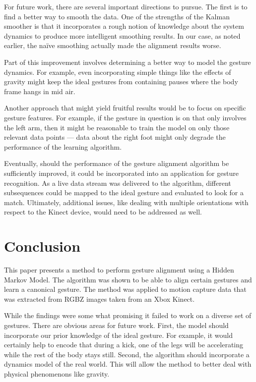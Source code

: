 \documentclass{article}
\begin{document}
For future work, there are several important directions to pursue. The first is to
find a better way to smooth the data. One of the strengths of the Kalman
smoother is that it incorporates a rough notion of knowledge about the
system dynamics to produce more intelligent smoothing results. In our case,
as noted earlier, the na\"ive smoothing actually made the alignment results
worse.

Part of this improvement involves determining a better way to model the gesture
dynamics. For example, even incorporating simple things like the effects of gravity
might keep the ideal gestures from containing pauses where the body frame
hangs in mid air.

Another approach that might yield fruitful results would be to focus on specific
gesture features. For example, if the gesture in question is on that only involves the
left arm, then it might be reasonable to train the model on only those relevant
data points --- data about the right foot might only degrade the performance of the
learning algorithm.

Eventually, should the performance of the gesture alignment algorithm be
sufficiently improved, it could be incorporated into an application for gesture
recognition. As a live data stream was delivered to the algorithm, different
subsequences could be mapped to the ideal gesture and evaluated to look
for a match. Ultimately, additional issues, like dealing with multiple orientations with
respect to the Kinect device, would need to be addressed as well.

\section{Conclusion}


This paper presents a method to perform gesture alignment using a Hidden
Markov Model. The algorithm was shown to be able to align certain gestures and
learn a canonical gesture. The method was applied to motion capture data that
was extracted from RGBZ images taken from an Xbox Kinect.

While the findings were some what promising it failed to work on a diverse set
of gestures. There are obvious areas for future work. First, the model should
incorporate our prior knowledge of the ideal gesture. For example, it would
certainly help to encode that during a kick, one of the legs will be
accelerating while the rest of the body stays still. Second, the algorithm
should incorporate a dynamics model of the real world. This will allow the
method to better deal with physical phenomenons like gravity.







\end{document}
